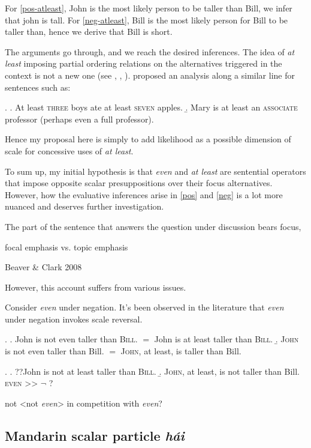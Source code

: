 \documentclass[12pt,letterpaper]{scrartcl}
\newcommand{\alignright}{\hspace*{\fill}}
\begin{document}
For \ref{pos-atleast}, John is the most likely person to be taller than Bill, we infer that john is tall. For \ref{neg-atleast}, Bill is the most likely person for Bill to be taller than, hence we derive that Bill is short.

The arguments go through, and we reach the desired inferences. The idea of \textit{at least} imposing partial ordering relations on the alternatives triggered in the context is not a new one (see \cite{krifka_at_1999}, \cite{geurts_at_2007}, \cite{nakanishi_epistemic_2009}). \cite{krifka_at_1999} proposed an analysis along a similar line for sentences such as:

\ex. \a. At least \textsc{three} boys ate at least \textsc{seven} apples.
\b. Mary is at least an \textsc{associate} professor (perhaps even a full professor).

Hence my proposal here is simply to add likelihood as a possible dimension of scale for concessive uses of \textit{at least}.

To sum up, my initial hypothesis is that \textit{even} and \textit{at least} are sentential operators that impose opposite scalar presuppositions over their focus alternatives. However, how the evaluative inferences arise in \ref{pos} and \ref{neg} is a lot more nuanced and deserves further investigation.

The part of the sentence that answers the question under discussion bears focus,

focal emphasis vs. topic emphasis

Beaver \& Clark 2008

However, this account suffers from various issues.






Consider \textit{even} under negation. It's been observed in the literature that \textit{even} under negation invokes scale reversal.

\ex. \a. John is not even taller than \textsc{Bill}.  $=$ John is at least taller than \textsc{Bill}.
\b. \textsc{John} is not even taller than Bill. $=$ \textsc{John}, at least, is  taller than Bill.

\ex. \a. ??John is not at least taller than \textsc{Bill}.
\b. \textsc{John}, at least, is not taller than Bill. \alignright \textsc{even} >> $\neg$ ?

not <not \textit{even}> in competition with \textit{even}?


\newpage
\subsection{Mandarin scalar particle \textit{h\'{a}i}} 
\end{document}
